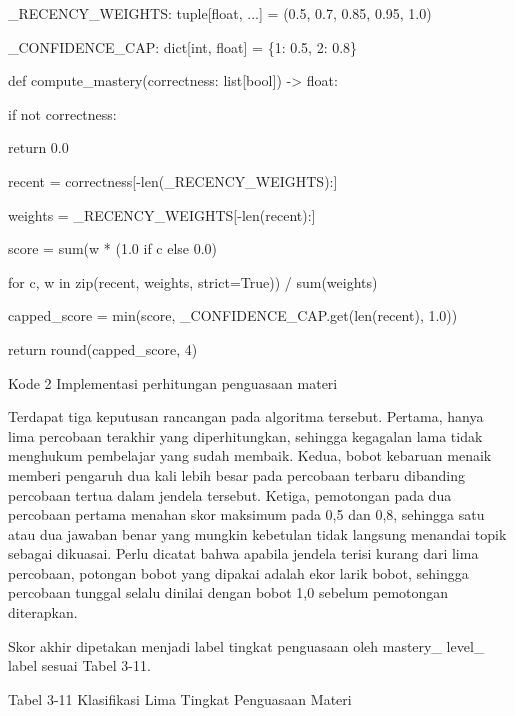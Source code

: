 \documentclass[12pt,a4paper]{article}
\begin{document}
\_RECENCY\_WEIGHTS: tuple{[}float, ...{]} = (0.5, 0.7, 0.85, 0.95, 1.0)



\_CONFIDENCE\_CAP: dict{[}int, float{]} = \{1: 0.5, 2: 0.8\}



def compute\_mastery(correctness: list{[}bool{]}) -\textgreater{} float:



if not correctness:



return 0.0



recent = correctness{[}-len(\_RECENCY\_WEIGHTS):{]}



weights = \_RECENCY\_WEIGHTS{[}-len(recent):{]}



score = sum(w * (1.0 if c else 0.0)



for c, w in zip(recent, weights, strict=True)) / sum(weights)



capped\_score = min(score, \_CONFIDENCE\_CAP.get(len(recent), 1.0))



return round(capped\_score, 4)



Kode 2	Implementasi perhitungan penguasaan materi



Terdapat tiga keputusan rancangan pada algoritma tersebut. Pertama, hanya lima percobaan terakhir yang diperhitungkan, sehingga kegagalan lama tidak menghukum pembelajar yang sudah membaik. Kedua, bobot kebaruan menaik memberi pengaruh dua kali lebih besar pada percobaan terbaru dibanding percobaan tertua dalam jendela tersebut. Ketiga, pemotongan pada dua percobaan pertama menahan skor maksimum pada 0,5 dan 0,8, sehingga satu atau dua jawaban benar yang mungkin kebetulan tidak langsung menandai topik sebagai dikuasai. Perlu dicatat bahwa apabila jendela terisi kurang dari lima percobaan, potongan bobot yang dipakai adalah ekor larik bobot, sehingga percobaan tunggal selalu dinilai dengan bobot 1,0 sebelum pemotongan diterapkan.



Skor akhir dipetakan menjadi label tingkat penguasaan oleh mastery\_ level\_ label sesuai Tabel 3-11.



Tabel 3-11	Klasifikasi Lima Tingkat Penguasaan Materi
\end{document}
